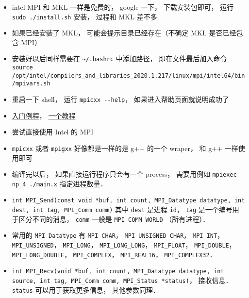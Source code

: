 
\begin{issues}
\issueDraft
\end{issues}

\begin{itemize}
\item intel MPI 和 MKL 一样是免费的， google 一下， 下载安装包即可， 运行 \verb`sudo ./install.sh` 安装， 过程和 MKL 差不多
\item 如果已经安装了 MKL， 可能会提示目录已经存在（不确定 MKL 是否已经包含 MPI）
\item 安装好以后同样需要在 \verb`~/.bashrc` 中添加路径， 即在文件最后加入命令 \verb`source /opt/intel/compilers_and_libraries_2020.1.217/linux/mpi/intel64/bin/mpivars.sh`
\item 重启一下 shell， 运行 \verb`mpicxx --help`， 如果进入帮助页面就说明成功了

\item \href{https://people.sc.fsu.edu/~jburkardt/cpp_src/hello_mpi/hello_mpi.html}{入门例程}， \href{https://www.codingame.com/playgrounds/349/introduction-to-mpi/introduction-to-distributed-computing}{一个教程}
\item 尝试直接使用 Intel 的 MPI
\item \verb`mpicxx` 或者 \verb`mpigxx` 好像都是一样的是 g++ 的一个 wraper， 和 g++ 一样使用即可
\item 编译完以后， 如果直接运行程序只会有一个 process， 需要用例如 \verb|mpiexec -np 4 ./main.x| 指定进程数量．
\item \verb|int MPI_Send(const void *buf, int count, MPI_Datatype datatype, int dest, int tag, MPI_Comm comm)| 其中 \verb|dest| 是进程 \verb|id|， \verb|tag| 是一个编号用于区分不同的消息， \verb|comm| 一般是 \verb|MPI_COMM_WORLD| （所有进程）．
\item 常用的 \verb|MPI_Datatype| 有 \verb|MPI_CHAR|， \verb|MPI_UNSIGNED_CHAR|， \verb|MPI_INT|， \verb|MPI_UNSIGNED|， \verb|MPI_LONG|， \verb|MPI_LONG_LONG|， \verb|MPI_FLOAT|， \verb|MPI_DOUBLE|， \verb|MPI_LONG_DOUBLE|， \verb|MPI_COMPLEX|， \verb|MPI_REAL16|， \verb|MPI_COMPLEX32|．
\item \verb|int MPI_Recv(void *buf, int count, MPI_Datatype datatype, int source, int tag, MPI_Comm comm, MPI_Status *status)|， 接收信息． \verb|status| 可以用于获取更多信息， 其他参数同理．
\end{itemize}
